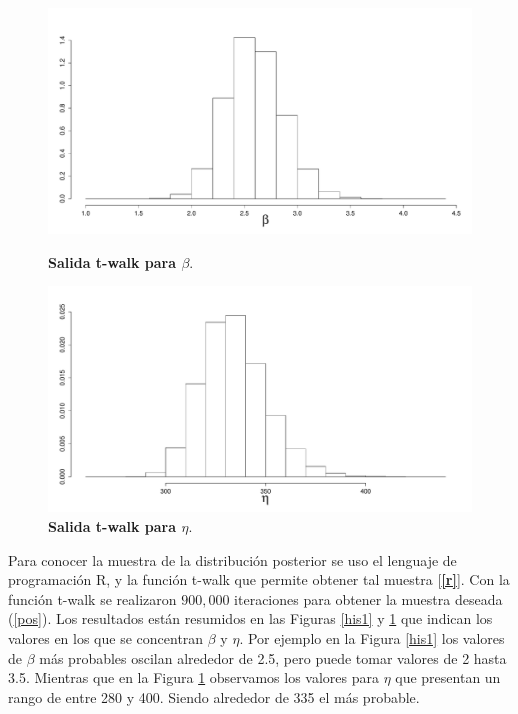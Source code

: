 \begin{figure}[h]
\begin{minipage}[b]{0.5\linewidth}
 \includegraphics[scale=0.2]{pos1.pdf}
  \caption{{\small \bf Salida t-walk para $\beta.$}}
  \label{his1}
\end{minipage}
\begin{minipage}[b]{0.45\linewidth}
  \includegraphics[scale=0.2]{pos2.pdf}
  \caption{{\small \bf Salida t-walk para $\eta.$}}
  \label{his2}
\end{minipage}
\end{figure}

\noindent Para conocer la muestra de la distribuci\'on posterior se uso el lenguaje de programaci\'on R, y la funci\'on t-walk que permite obtener tal muestra [{\bf \ref{r}}]. Con la funci\'on t-walk se realizaron $900,000$ iteraciones para obtener la muestra deseada (\ref{pos}). Los resultados est\'an resumidos en las Figuras \ref{his1} y \ref{his2} que indican los valores en los que  se concentran $\beta$ y $\eta$. Por ejemplo en la Figura 
 \ref{his1} los valores de $\beta$ m\'as probables oscilan alrededor de 2.5, pero puede tomar valores de 2 hasta 3.5. Mientras que en la Figura \ref{his2} observamos los valores para $\eta$ que presentan un rango de entre 280 y 400. Siendo alrededor de 335 el m\'as probable.
 
